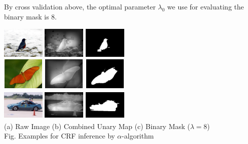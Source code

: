 \documentclass[10pt,twocolumn,letterpaper]{article}
\begin{document}
By cross validation above, the optimal parameter $\lambda_0$ we use for evaluating the binary mask is 8.

\begin{center}
    \includegraphics[width=0.8in,height=0.6in]{./Figures/CRFinference/5_159_159364.jpg}
    \includegraphics[width=0.8in,height=0.6in]{./Figures/CRFinference/5_159_159364_3.jpg}
    \includegraphics[width=0.8in,height=0.6in]{./Figures/CRFinference/5_159_159364_2.jpg} \\
    \includegraphics[width=0.8in,height=0.6in]{./Figures/CRFinference/5_159_159649.jpg}
    \includegraphics[width=0.8in,height=0.6in]{./Figures/CRFinference/5_159_159649_3.jpg}
    \includegraphics[width=0.8in,height=0.6in]{./Figures/CRFinference/5_159_159649_2.jpg} \\
    \includegraphics[width=0.8in,height=0.6in]{./Figures/CRFinference/5_162_162349.jpg}
    \includegraphics[width=0.8in,height=0.6in]{./Figures/CRFinference/5_162_162349_3.jpg}
    \includegraphics[width=0.8in,height=0.6in]{./Figures/CRFinference/5_162_162349_2.jpg} \\
    \footnotesize  (a) Raw Image (b) Combined Unary Map  (c) Binary Mask ($\lambda=8$)\\
     Fig. Examples for CRF inference by $\alpha$-algorithm
\end{center}
\end{document}
